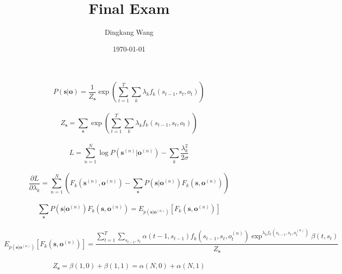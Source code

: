 \documentclass[11pt]{article}
\title {\vspace*{-2em}Final Exam}
\author{Dingkang Wang}
\date {\today}
\begin{document}
\maketitle

\begin{equation}
    P(\mathbf{s}|\mathbf{o}) = \frac{1}{Z_{\mathbf{s}}} \exp \left( \sum_{t=1}^{T} \sum_{k} \lambda_k f_k(s_{t-1}, s_t, o_t) \right)
\end{equation}
\\

\begin{equation}
    Z_{\mathbf{s}} = \sum_{\mathbf{s}} \exp \left( \sum_{t=1}^{T} \sum_{k} \lambda_k f_k(s_{t-1}, s_t, o_t) \right)
\end{equation}
\\    

\begin{equation}
    L = \sum_{n=1}^{N} \log P( \mathbf{s}^{(n)} | \mathbf{o}^{(n)}) - \sum_{k} \frac{\lambda_k^2}{2\sigma}
\end{equation}
\\

\begin{equation}
    \frac{\partial L}{\partial \lambda_k} = \sum_{n=1}^{N} \left( F_k ( \mathbf{s}^{(n)}, \mathbf{o}^{(n)} ) - \sum_{\mathbf{s}} P( \mathbf{s} | \mathbf{o}^{(n)}) F_k ( \mathbf{s}, \mathbf{o}^{(n)} ) \right)
\end{equation}
\\

\begin{equation}
    \sum_{\mathbf{s}} P( \mathbf{s} | \mathbf{o}^{(n)}) F_k ( \mathbf{s}, \mathbf{o}^{(n)} ) = E_{p(\mathbf{s}|\mathbf{o}^{(n)})} [ F_k(\mathbf{s}, \mathbf{o}^{(n)}) ]
\end{equation}
\\

\begin{equation}
     E_{p(\mathbf{s}|\mathbf{o}^{(n)})} [ F_k(\mathbf{s}, \mathbf{o}^{(n)}) ] = \frac{\sum_{t=1}^{T} \sum_{s_{t-1}, s_t} \alpha(t-1, s_{t-1}) f_k(s_{t-1}, s_{t}, o^{(n)}_t) \exp^{\lambda_k f_k(s_{t-1}, s_{t}, o^{(n)}_t)} \beta(t, s_t)}{Z_{\mathbf{s}}}
\end{equation}
\\

\begin{equation}
     Z_{\mathbf{s}} = \beta(1, 0) + \beta(1, 1) = \alpha(N, 0) + \alpha(N, 1)
\end{equation}
\\
\end{document}

